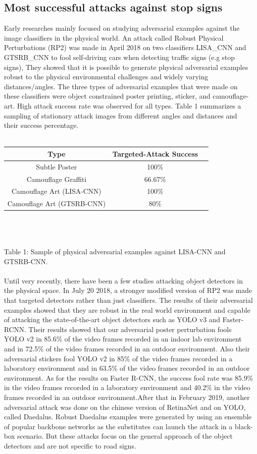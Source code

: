 \documentclass[sigconf, nonacm]{acmart}
\begin{document}
\subsection{ Most successful attacks against stop signs  }
Early researches mainly focused on studying adversarial examples against the image classifiers in the physical world. An attack called Robust Physical Perturbations (RP2)\cite{Abril02} was made in April 2018 on two classifiers LISA\_CNN and GTSRB\_CNN to fool self-driving cars when detecting traffic signs (e.g stop signs), They showed that it is possible to generate physical adversarial examples robust to the physical environmental challenges and widely varying distances/angles.\cite{Abril07} The three types of adversarial examples that were made on these classifiers were object constrained poster printing, sticker, and camouflage-art. High attack success rate was observed for all types. Table 1 summarizes a sampling of stationary attack images from different angles and distances and their success percentage.
\\
\\
  \begin{tabular}{ccl}
    \toprule
    Type & Targeted-Attack Success\\
    \midrule
    Subtle Poster &  100$\%$ \\
    Camouflage Graffiti & 66.67$\%$\\
    Camouflage Art (LISA-CNN) & 100$\%$\\
    Camouflage Art (GTSRB-CNN) & 80$\%$\\
  \bottomrule
\end{tabular}
\\
\\
\\Table 1: Sample of physical adversarial examples against LISA-CNN and GTSRB-CNN.
\\
\\Until very recently, there have been a few studies attacking object detectors in the physical space. In July 20 2018, a stronger modified version of RP2 was made that targeted detectors rather than just classifiers. The results of their adversarial examples showed that they are robust in the real world environment and capable of attacking the state-of-the-art object detectors such as YOLO v3 and Faster-RCNN. Their results showed that our adversarial poster perturbation fools YOLO v2 in 85.6\% of the video frames recorded in an indoor lab environment and in 72.5\% of the video frames recorded in an outdoor environment. Also their adversarial stickers fool YOLO v2 in 85\% of the video frames recorded in a laboratory environment and in 63.5\% of the video frames recorded in an outdoor environment. As for the results on Faster R-CNN, the success fool rate was 85.9\% in the video frames recorded in a laboratory environment and 40.2\% in the video frames recorded in an outdoor environment.After that in February 2019, another adversarial attack was done on the chinese version of RetinaNet and on YOLO, called Daedalus\cite{Abril03}. Robust Daedalus examples were generated by using an ensemble of popular backbone networks as the substitutes can launch the attack in a black-box scenario. But these attacks focus on the general approach of the object detectors and are not specific to road signs.
\end{document}
